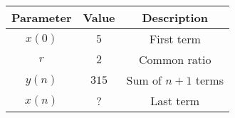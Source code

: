 \begin{tabular}{|c|c|c|}
    \hline
    \textbf{Parameter} & \textbf{Value} & \textbf{Description} \\
    \hline
    $x(0)$ & $5$ & First term \\
    \hline
    $r$ & $2$ & Common ratio \\
    \hline
    $y(n)$ & $315$ & Sum of $n+1$ terms \\
    \hline
    $x(n)$ & ? & Last term\\
    \hline
\end{tabular}

